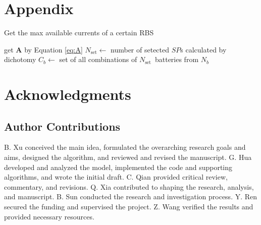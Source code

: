 \documentclass{article}
\begin{document}
\section{Appendix} 

\begin{algorithm}
    \caption{Get the max available currents of a certain RBS}\label{alg:greedy}
    \KwResult{$\max \eta$}
    get $\bm{A}$ by Equation \ref{eq:A}\;
    {
        $N_{\text{set}} \leftarrow$ number of setected $SP$s calculated by dichotomy\;
        $C_b    \leftarrow$ set of all combinations of $N_{\text{set}} $~batteries from $N_b$\;
    }
\end{algorithm}


\section*{Acknowledgments}

\subsection*{Author Contributions} 

B. Xu conceived the main idea, formulated the overarching research goals and aims, designed the algorithm, and reviewed and revised the manuscript.
G. Hua developed and analyzed the model, implemented the code and supporting algorithms, and wrote the initial draft.
C. Qian provided critical review, commentary, and revisions.
Q. Xia contributed to shaping the research, analysis, and manuscript.
B. Sun conducted the research and investigation process.
Y. Ren secured the funding and supervised the project.
Z. Wang verified the results and provided necessary resources.
\end{document}
